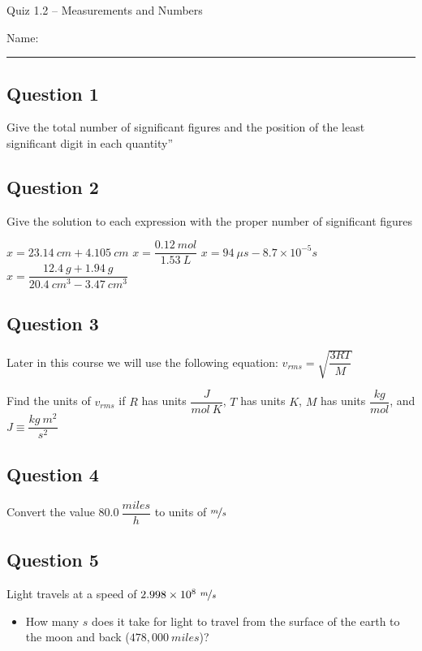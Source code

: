 \documentclass[11pt, letterpaper]{memoir}
\begin{document}
	\begin{center}
		{\large Quiz 1.2 --	Measurements and Numbers}
	\end{center}
	{\large Name: \rule[-1mm]{4in}{.1pt} 
	\subsection*{Question 1}
	Give the total number of significant figures and the position of the least significant digit in each quantity”
	
	
	\vspace{3em}
	\subsection*{Question 2}
	Give the solution to each expression with the proper number of significant figures
	
	\noindent$x = 23.14~cm+4.105~cm$ \hspace{2em} $x = \dfrac{0.12~mol}{1.53~L}$ \hspace{2em} $x=94~\mu s - 8.7\times10^{-5}s$ \hspace{2em} $x=\dfrac{12.4~g+1.94~g}{20.4~cm^3-3.47~cm^3}$  
	
	\vspace{3em}
	\subsection*{Question 3}
	Later in this course we will use the following equation: $v_{rms}=\sqrt{\dfrac{3RT}{M}}$
	
	\noindent Find the units of $v_{rms}$ if $R$ has units $\dfrac{J}{mol~K}$, $T$ has units $K$, $M$ has units $\dfrac{kg}{mol}$, and $J\equiv \dfrac{kg~m^2}{s^2}$
	
	\vspace{3em}
	\subsection*{Question 4}
	Convert the value $80.0~\dfrac{miles}{h}$ to units of $\nicefrac{m}{s}$ 
	
	\vspace{3em}
	\subsection*{Question 5}
	Light travels at a speed of $2.998\times10^8~\nicefrac{m}{s}$
	\begin{itemize}
		\item How many $s$ does it take for light to travel from the surface of the earth to the moon and back ($478,000~miles$)?
		

\end{itemize}}
\end{document}
